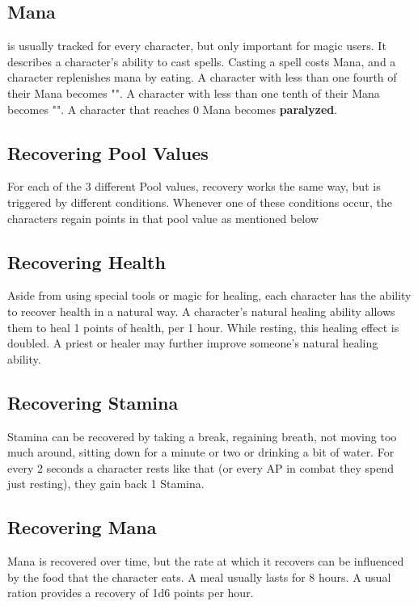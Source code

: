 \subsection{Mana}\label{pool:mana} is usually tracked for every character, but only important for magic users.
It describes a character's ability to cast spells.
Casting a spell costs Mana, and a character replenishes mana by eating.
A character with less than one fourth of their Mana becomes "".
A character with less than one tenth of their Mana becomes "".
A character that reaches 0 Mana becomes \textbf{paralyzed}.\\

\subsection{Recovering Pool Values}\label{subsec:recoveringPoolValues}
For each of the 3 different Pool values, recovery works the same way, but is triggered by different conditions.
Whenever one of these conditions occur, the characters regain points in that pool value as mentioned below

\subsection{Recovering Health}\label{subsec:recoverHealth}
Aside from using special tools or magic for healing, each character has the ability to recover health in a natural way.
A character's natural healing ability allows them to heal 1 points of health, per 1 hour.
While resting, this healing effect is doubled.
A priest or healer may further improve someone's natural healing ability.

\subsection{Recovering Stamina}\label{subsec:recoverStamina}
Stamina can be recovered by taking a break, regaining breath, not moving too much around, sitting down for a minute or two or drinking a bit of water.
For every 2 seconds a character rests like that (or every AP in combat they spend just resting), they gain back 1 Stamina.

\subsection{Recovering Mana}\label{subsec:recoverMana}
Mana is recovered over time, but the rate at which it recovers can be influenced by the food that the character eats.
A meal usually lasts for 8 hours.
A usual ration provides a recovery of 1d6 points per hour.

